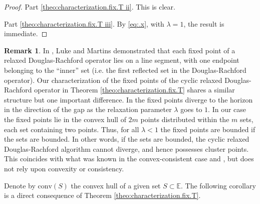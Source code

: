 \documentclass[12pt]{article}
\theoremstyle{definition}
\newtheorem{remark}{Remark}
\newcommand{\conv}{\mathrm{conv}}
\begin{document}
\begin{proof}
Part \eqref{theo:characterization.fix.T ii}. This is clear.

Part \eqref{theo:characterization.fix.T iii}. By \eqref{eq:.x}, with $\lambda=1$, the result is immediate.
\end{proof}
\begin{remark}
In \cite[Theorem 3.13]{luke2020convergence}, Luke and Martins demonstrated that each fixed point of a relaxed Douglas-Rachford operator lies on a line segment, with one endpoint belonging to the ``inner'' set (i.e. the first reflected set in the Douglas-Rachford operator). Our characterization of the fixed points of the cyclic relaxed Douglas-Rachford operator in Theorem \ref{theo:characterization.fix.T} shares a similar structure but one important difference.
In \cite[Theorem 3.13]{luke2020convergence} the fixed points diverge to the horizon in the direction of the gap as the relaxation parameter $\lambda$ goes to $1$.  In our case the fixed points lie in the convex hull of $2m$ points distributed within the $m$ sets, each set containing two points.  Thus, for all  $\lambda< 1$ the fixed points are bounded if the sets are bounded.  In other words, if the sets are bounded, the cyclic relaxed Douglas-Rachford algorithm cannot diverge, and hence possesses cluster points.  This coincides with what was known in the convex-consistent case \cite[Theorem 3.1]{BorTam14} and \cite[Theorem 2]{luke2018relaxed}, but does not rely upon convexity or consistency.
\end{remark}
Denote by $\conv(S)$ the convex hull of a given set $S\subset \mathbb E$.
The following corollary is a direct consequence of Theorem \ref{theo:characterization.fix.T}.
\end{document}
